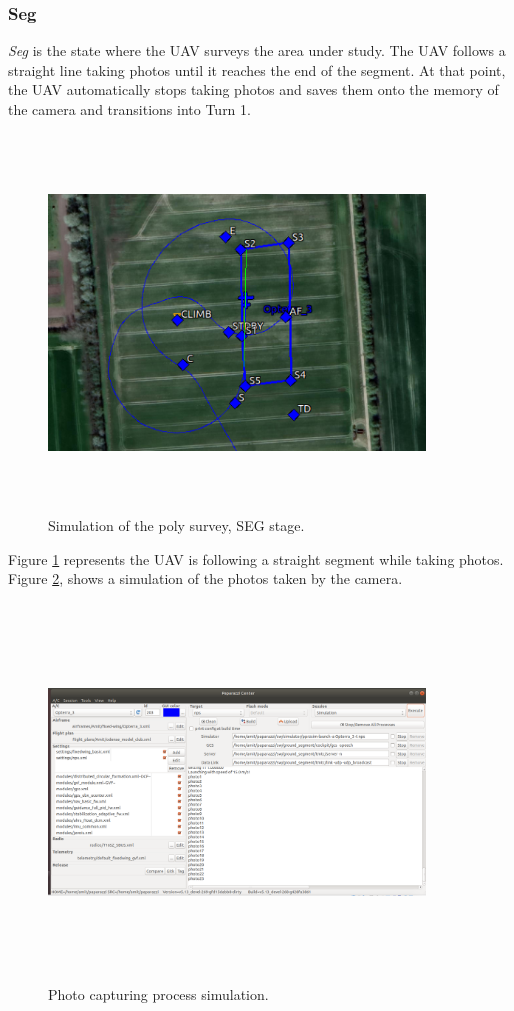 \subsubsection{Seg}
\textit{Seg} is the state where the UAV surveys the area under study. The UAV follows a straight line taking photos until it reaches the end of the segment. At that point, the UAV automatically stops taking photos and saves them onto the memory of the camera and transitions into Turn 1.
\begin{figure}[H]
\centering
\includegraphics[width=10cm,height=10cm,keepaspectratio]{imagenes/SEG.png}
\caption{Simulation of the poly survey, SEG stage.}
\label{fig:SEG_stage}
\end{figure}

 Figure \ref{fig:SEG_stage} represents the UAV is following a straight segment while taking photos. Figure \ref{fig:Photos}, shows a simulation of the photos taken by the camera.
\begin{figure}[H]
\centering
\includegraphics[width=10cm,height=10cm,keepaspectratio]{imagenes/Photos.png}
\caption{Photo capturing process simulation.}
\label{fig:Photos}
\end{figure}

